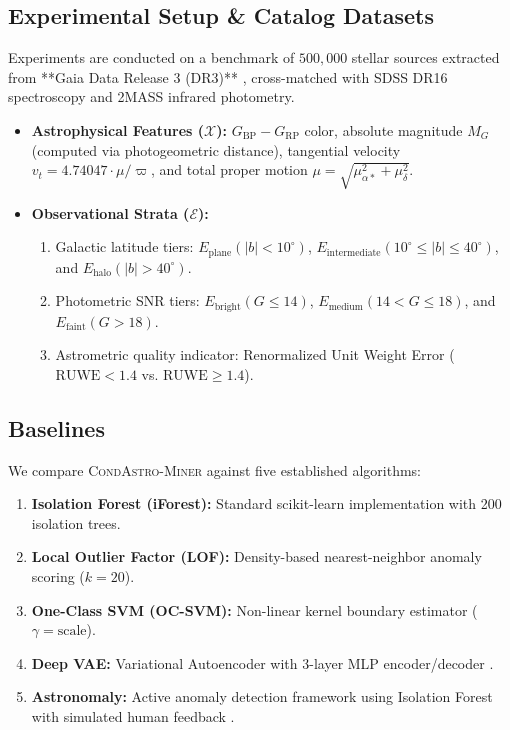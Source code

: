 \documentclass[10pt,a4paper]{article}
\begin{document}
\subsection{Experimental Setup \& Catalog Datasets}
Experiments are conducted on a benchmark of $500,000$ stellar sources extracted from **Gaia Data Release 3 (DR3)** \citep{gaiadr32023}, cross-matched with SDSS DR16 spectroscopy and 2MASS infrared photometry.
\begin{itemize}
    \item \textbf{Astrophysical Features ($\mathcal{X}$):} $G_{\text{BP}} - G_{\text{RP}}$ color, absolute magnitude $M_G$ (computed via photogeometric distance), tangential velocity $v_t = 4.74047 \cdot \mu / \varpi$, and total proper motion $\mu = \sqrt{\mu_{\alpha*}^2 + \mu_\delta^2}$.
    \item \textbf{Observational Strata ($\mathcal{E}$):} 
      \begin{enumerate}
          \item Galactic latitude tiers: $E_{\text{plane}} (|b| < 10^\circ)$, $E_{\text{intermediate}} (10^\circ \le |b| \le 40^\circ)$, and $E_{\text{halo}} (|b| > 40^\circ)$.
          \item Photometric SNR tiers: $E_{\text{bright}} (G \le 14)$, $E_{\text{medium}} (14 < G \le 18)$, and $E_{\text{faint}} (G > 18)$.
          \item Astrometric quality indicator: Renormalized Unit Weight Error ($\text{RUWE} < 1.4$ vs. $\text{RUWE} \ge 1.4$).
      \end{enumerate}
\end{itemize}

\subsection{Baselines}
We compare \textsc{CondAstro-Miner} against five established algorithms:
\begin{enumerate}
    \item \textbf{Isolation Forest (iForest):} Standard scikit-learn implementation with 200 isolation trees.
    \item \textbf{Local Outlier Factor (LOF):} Density-based nearest-neighbor anomaly scoring ($k=20$).
    \item \textbf{One-Class SVM (OC-SVM):} Non-linear kernel boundary estimator ($\gamma = \text{scale}$).
    \item \textbf{Deep VAE:} Variational Autoencoder with 3-layer MLP encoder/decoder \citep{villar2020vae}.
    \item \textbf{Astronomaly:} Active anomaly detection framework using Isolation Forest with simulated human feedback \citep{lochner2021astronomaly}.
\end{enumerate}
\end{document}
